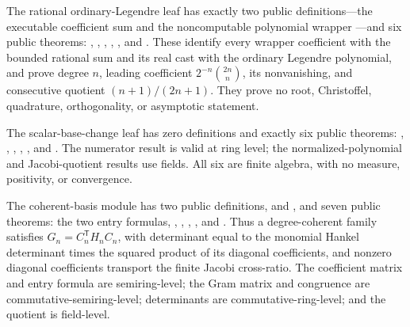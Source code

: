 \documentclass[11pt]{article}
\theoremstyle{definition}
\theoremstyle{remark}
\begin{document}
\begin{remark}
The rational ordinary-Legendre leaf  has exactly two
public definitions---the executable coefficient sum
 and the noncomputable polynomial wrapper
---and six public theorems:
, ,
,
,
, and
.  These identify every wrapper coefficient
with the bounded rational sum and its real cast with the ordinary Legendre polynomial, and
prove degree \(n\), leading coefficient \(2^{-n}\binom{2n}{n}\), its nonvanishing, and
consecutive quotient \((n+1)/(2n+1)\).  They prove no root, Christoffel, quadrature,
orthogonality, or asymptotic statement.

The scalar-base-change leaf  has zero
definitions and exactly six public theorems:
, ,
, ,
, and
.  The numerator result is valid at
ring level; the normalized-polynomial and Jacobi-quotient results use fields.
All six are finite algebra, with no measure, positivity, or convergence.

The coherent-basis module  has two
public definitions,  and
, and seven public theorems: the two entry formulas,
,
,
,
, and
.
Thus a degree-coherent family satisfies \(G_n=C_n^{\mathsf T}H_nC_n\), with determinant
equal to the monomial Hankel determinant times the squared product of its diagonal
coefficients, and nonzero diagonal coefficients transport the finite Jacobi cross-ratio.
The coefficient matrix and entry formula are semiring-level; the Gram matrix and
congruence are commutative-semiring-level; determinants are commutative-ring-level; and
the quotient is field-level.


\end{remark}
\end{document}
